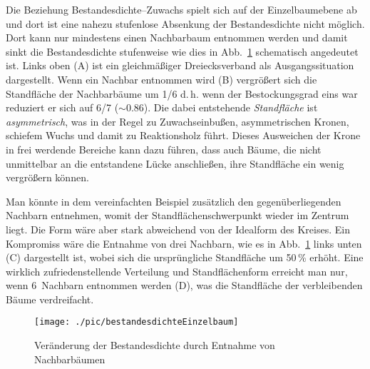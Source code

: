 \documentclass[twocolumn]{scrartcl}
\begin{document}
Die Beziehung Bestandesdichte--Zuwachs spielt sich auf der Einzelbaumebene ab
und dort ist eine nahezu stufenlose Absenkung der Bestandesdichte nicht möglich.
Dort kann nur mindestens einen Nachbarbaum entnommen werden und damit sinkt die
Bestandesdichte stufenweise wie dies in Abb.~\ref{fig:bestandesdichteEinzelbaum}
schematisch angedeutet ist. Links oben (A) ist ein gleichmäßiger Dreiecksverband
als Ausgangssituation dargestellt. Wenn ein Nachbar entnommen wird (B)
vergrößert sich die Standfläche der Nachbarbäume um 1/6 d.\,h. wenn der
Bestockungsgrad eins war reduziert er sich auf 6/7 ($\sim 0.86$). Die dabei
entstehende \emph{Standfläche} ist \emph{asymmetrisch}, was in der Regel zu
Zuwachseinbußen, asymmetrischen Kronen, schiefem Wuchs und damit zu
Reaktionsholz führt. Dieses Ausweichen der Krone in frei werdende Bereiche kann
dazu führen, dass auch Bäume, die nicht unmittelbar an die entstandene Lücke
anschließen, ihre Standfläche ein wenig vergrößern können.

Man könnte in dem vereinfachten Beispiel zusätzlich den gegenüberliegenden
Nachbarn entnehmen, womit der Standflächenschwerpunkt wieder im Zentrum liegt.
Die Form wäre aber stark abweichend von der Idealform des Kreises. Ein
Kompromiss wäre die Entnahme von drei Nachbarn, wie es in
Abb.~\ref{fig:bestandesdichteEinzelbaum} links unten (C) dargestellt ist, wobei
sich die ursprüngliche Standfläche um 50\,\% erhöht. Eine wirklich
zufriedenstellende Verteilung und Standflächenform erreicht man nur, wenn
6~Nachbarn entnommen werden (D), was die Standfläche der verbleibenden Bäume
verdreifacht.

\begin{figure}[htbp]
  \centering
  \texttt{[image: ./pic/bestandesdichteEinzelbaum]}
  \caption{Veränderung der Bestandesdichte durch Entnahme von Nachbarbäumen}
  \label{fig:bestandesdichteEinzelbaum}
\end{figure}
\end{document}
